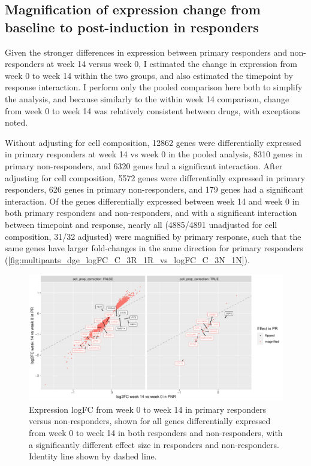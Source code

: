 \subsection{Magnification of expression change from baseline to post-induction in responders}

Given the stronger differences in expression between primary responders and non-responders at week 14 versus week 0,
I estimated the change in expression from week 0 to week 14 within the two groups, and also estimated the timepoint by response interaction.
I perform only the pooled comparison here both to simplify the analysis, and because similarly to the within week 14 comparison, change from week 0 to week 14 was relatively consistent between drugs, with exceptions noted.

Without adjusting for cell composition,
12862 genes were differentially expressed in primary responders at week 14 vs week 0 in the pooled analysis,
8310 genes in primary non-responders,
and 6320 genes had a significant interaction.
After adjusting for cell composition, 
5572 genes were differentially expressed in primary responders,
626 genes in primary non-responders,
and 179 genes had a significant interaction.
Of the genes differentially expressed between week 14 and week 0 in both primary responders and non-responders,
and with a significant interaction between timepoint and response, 
nearly all (4885/4891 unadjusted for cell composition, 31/32 adjusted) were magnified by primary response,
such that the same genes have larger fold-changes in the same direction for primary responders (\autoref{fig:multipants_dge_logFC_C_3R_1R_vs_logFC_C_3N_1N}).

\begin{figure}
    \centering
    \includegraphics[width=1.0\textwidth,page=1]{mainmatter/figures/chapter_04/plot_gene_set_enrichment.logFC_C_3R_1R_vs_logFC_C_3N_1N.pdf}
    \caption{Expression logFC from week 0 to week 14 in primary responders versus non-responders, shown for all genes differentially expressed from week 0 to week 14 in both responders and non-responders, with a significantly different effect size in responders and non-responders. Identity line shown by dashed line.}
    \label{fig:multipants_dge_logFC_C_3R_1R_vs_logFC_C_3N_1N}
\end{figure}

